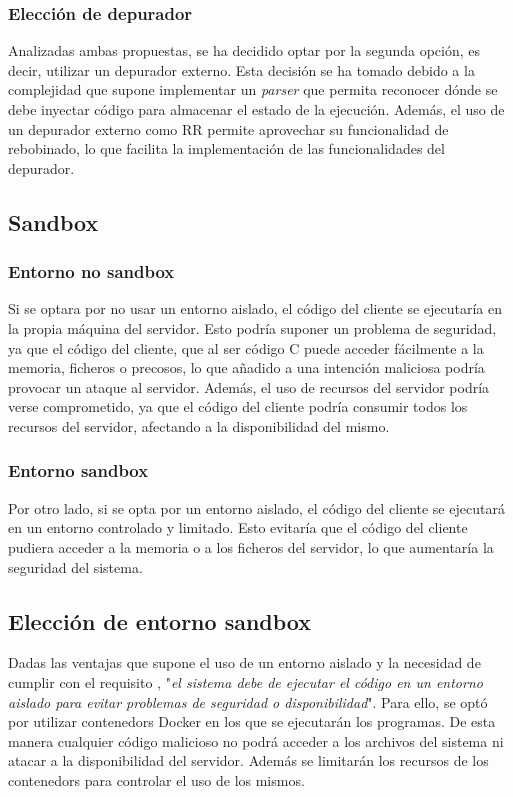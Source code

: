 \subsubsection{Elección de depurador} \label{subsec:eleccion-depurador}

Analizadas ambas propuestas, se ha decidido optar por la segunda opción, es decir, utilizar un depurador externo. Esta decisión se ha tomado debido a la complejidad que supone implementar un \textit{\gls{parser}} que permita reconocer dónde se debe inyectar código para almacenar el estado de la ejecución. Además, el uso de un depurador externo como RR permite aprovechar su funcionalidad de rebobinado, lo que facilita la implementación de las funcionalidades del depurador.
    
\subsection{Sandbox} \label{subsec:sandbox}

\subsubsection{Entorno no sandbox} \label{subsubsec:entorno-no-sandbox}
Si se optara por no usar un entorno aislado, el código del cliente se ejecutaría en la propia máquina del servidor. Esto podría suponer un problema de seguridad, ya que el código del cliente, que al ser código C puede acceder fácilmente a la memoria, ficheros o precosos, lo que añadido a una intención maliciosa podría provocar un ataque al servidor. Además, el uso de recursos del servidor podría verse comprometido, ya que el código del cliente podría consumir todos los recursos del servidor, afectando a la disponibilidad del mismo.

\subsubsection{Entorno sandbox} \label{subsubsec:entorno-sandbox}
Por otro lado, si se opta por un entorno aislado, el código del cliente se ejecutará en un entorno controlado y limitado. Esto evitaría que el código del cliente pudiera acceder a la memoria o a los ficheros del servidor, lo que aumentaría la seguridad del sistema. 


\subsection{Elección de entorno sandbox} \label{subsec:eleccion-sandbox}
Dadas las ventajas que supone el uso de un entorno aislado y la necesidad de cumplir con  el requisito , "\textit{el sistema debe de ejecutar el código en un entorno aislado para evitar problemas de seguridad o disponibilidad}". Para ello, se optó por utilizar \glspl{contenedor} Docker en los que se ejecutarán los programas. De esta manera cualquier código malicioso no podrá acceder a los archivos del sistema ni atacar a la disponibilidad del servidor. Además se limitarán los recursos de los \glspl{contenedor} para controlar el uso de los mismos.

